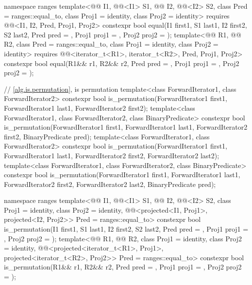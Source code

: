 \begin{codeblock}
{  namespace ranges {
    template<@@ I1, @@<I1> S1, @@ I2, @@<I2> S2,
             class Pred = ranges::equal_to, class Proj1 = identity, class Proj2 = identity>
      requires @@<I1, I2, Pred, Proj1, Proj2>
      constexpr bool equal(I1 first1, S1 last1, I2 first2, S2 last2,
                           Pred pred = {},
                           Proj1 proj1 = {}, Proj2 proj2 = {});
    template<@@ R1, @@ R2, class Pred = ranges::equal_to,
             class Proj1 = identity, class Proj2 = identity>
      requires @@<iterator_t<R1>, iterator_t<R2>, Pred, Proj1, Proj2>
      constexpr bool equal(R1&& r1, R2&& r2, Pred pred = {},
                           Proj1 proj1 = {}, Proj2 proj2 = {});
  }

  // \ref{alg.is.permutation}, is permutation
  template<class ForwardIterator1, class ForwardIterator2>
    constexpr bool is_permutation(ForwardIterator1 first1, ForwardIterator1 last1,
                                  ForwardIterator2 first2);
  template<class ForwardIterator1, class ForwardIterator2, class BinaryPredicate>
    constexpr bool is_permutation(ForwardIterator1 first1, ForwardIterator1 last1,
                                  ForwardIterator2 first2, BinaryPredicate pred);
  template<class ForwardIterator1, class ForwardIterator2>
    constexpr bool is_permutation(ForwardIterator1 first1, ForwardIterator1 last1,
                                  ForwardIterator2 first2, ForwardIterator2 last2);
  template<class ForwardIterator1, class ForwardIterator2, class BinaryPredicate>
    constexpr bool is_permutation(ForwardIterator1 first1, ForwardIterator1 last1,
                                  ForwardIterator2 first2, ForwardIterator2 last2,
                                  BinaryPredicate pred);

  namespace ranges {
    template<@@ I1, @@<I1> S1, @@ I2,
             @@<I2> S2, class Proj1 = identity, class Proj2 = identity,
             @@<projected<I1, Proj1>,
                                           projected<I2, Proj2>> Pred = ranges::equal_to>
      constexpr bool is_permutation(I1 first1, S1 last1, I2 first2, S2 last2,
                                    Pred pred = {},
                                    Proj1 proj1 = {}, Proj2 proj2 = {});
    template<@@ R1, @@ R2,
             class Proj1 = identity, class Proj2 = identity,
             @@<projected<iterator_t<R1>, Proj1>,
                                           projected<iterator_t<R2>, Proj2>>
               Pred = ranges::equal_to>
      constexpr bool is_permutation(R1&& r1, R2&& r2, Pred pred = {},
                                    Proj1 proj1 = {}, Proj2 proj2 = {});
  }

}
\end{codeblock}
